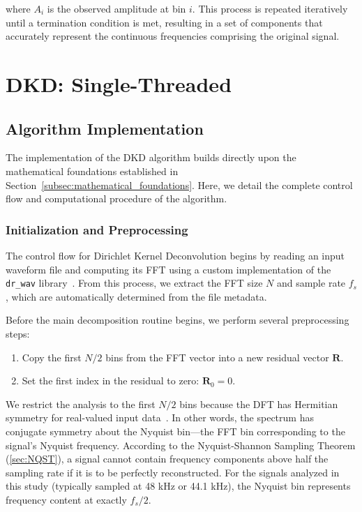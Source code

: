\documentclass[11pt,twoside]{report}
\numberwithin{thm}{section}
\numberwithin{equation}{section}
\begin{document}
where $A_i$ is the observed amplitude at bin $i$. This process is repeated iteratively until a termination condition is met, resulting in a set of components that accurately represent the continuous frequencies comprising the original signal.
\clearpage
\section{DKD: Single-Threaded}


\subsection{Algorithm Implementation}
\label{subsec:algorithm_implementation}

The implementation of the DKD algorithm builds directly upon the mathematical foundations established in Section~\ref{subsec:mathematical_foundations}. Here, we detail the complete control flow and computational procedure of the algorithm.

\subsubsection{Initialization and Preprocessing}

The control flow for Dirichlet Kernel Deconvolution begins by reading an input waveform file and computing its FFT using a custom implementation of the \texttt{dr\_wav} library~\cite{dr_wav}. From this process, we extract the FFT size $N$ and sample rate $f_s$, which are automatically determined from the file metadata.

Before the main decomposition routine begins, we perform several preprocessing steps:
\begin{enumerate}
    \item Copy the first $N/2$ bins from the FFT vector into a new residual vector $\mathbf{R}$.
    \item Set the first index in the residual to zero: $\mathbf{R}_0 = 0$.
\end{enumerate}
We restrict the analysis to the first $N/2$ bins because the DFT has Hermitian symmetry for real-valued input data~\cite{xu2006algorithm}. In other words, the spectrum has conjugate symmetry about the Nyquist bin—the FFT bin corresponding to the signal's Nyquist frequency. According to the Nyquist-Shannon Sampling Theorem (\ref{sec:NQST}), a signal cannot contain frequency components above half the sampling rate if it is to be perfectly reconstructed. For the signals analyzed in this study (typically sampled at 48 kHz or 44.1 kHz), the Nyquist bin represents frequency content at exactly $f_s/2$.
\end{document}
